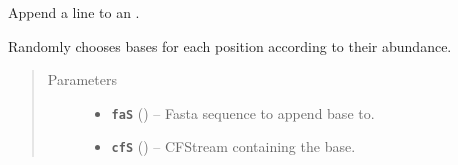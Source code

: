 \documentclass[letterpaper,10pt,english]{sphinxmanual}
\begin{document}

\begin{fulllineitems}
\label{cf:libPoMo.cf.faseq_append_base_of_cfS}
Append a {\hyperref[cf:libPoMo.cf.CFStream]{}} line to an {\hyperref[fasta:libPoMo.fasta.FaSeq]{}}.

Randomly chooses bases for each position according to their
abundance.
\begin{quote}\begin{description}
\item[{Parameters}] \leavevmode\begin{itemize}
\item {} 
\textbf{\texttt{faS}} ({\hyperref[fasta:libPoMo.fasta.FaSeq]{}}) -- Fasta sequence to append base to.

\item {} 
\textbf{\texttt{cfS}} ({\hyperref[cf:libPoMo.cf.CFStream]{}}) -- CFStream containing the base.

\end{itemize}

\end{description}\end{quote}

\end{fulllineitems}

\end{document}
